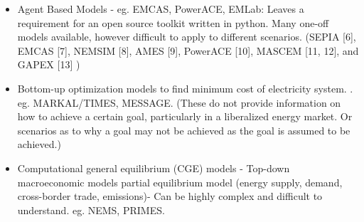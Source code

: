 \begin{itemize}
	\item Agent Based Models - eg. EMCAS, PowerACE, EMLab: Leaves a requirement for an open source toolkit written in python. Many one-off models available, however difficult to apply to different scenarios.
	(SEPIA [6], EMCAS [7], NEMSIM [8], AMES [9], PowerACE [10], MASCEM [11, 12], and GAPEX [13] \cite{Lopes})
	\item Bottom-up optimization models to find minimum cost of electricity system. \cite{Pfenninger2014}. eg. MARKAL/TIMES, MESSAGE. (These do not provide information on how to achieve a certain goal, particularly in a liberalized energy market. Or scenarios as to why a goal may not be achieved as the goal is assumed to be achieved.)
	\item Computational general equilibrium (CGE) models - Top-down macroeconomic models partial equilibrium model (energy supply, demand, cross-border trade, emissions)- Can be highly complex and difficult to understand. eg. NEMS, PRIMES.
\end{itemize}




